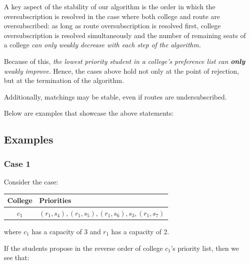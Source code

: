 \documentclass{article}
\begin{document}
A key aspect of the stability of our algorithm is the order in which the oversubscription is resolved in the case where both college and route are oversubscribed: as long as route oversubscription is resolved first, college oversubscription is resolved simultaneously and the number of remaining seats of a college \textit{can only weakly decrease with each step of the algorithm.}

Because of this, \textit{the lowest priority student in a college's preference list can \textbf{only} weakly improve.} Hence, the cases above hold not only at the point of rejection, but at the termination of the algorithm.

Additionally, matchings may be stable, even if routes are undersubscribed.

Below are examples that showcase the above statements:

\subsection{Examples}
\subsubsection{Case 1}
Consider the case:

\begin{center}
    \begin{tabular}{ c|l }
        College&Priorities \\
        \hline
        $c_1$&$(r_1,s_4),(r_1,s_5),(r_1,s_6),s_3,(r_1,s_7)$ \\
    \end{tabular}
\end{center}

where $c_1$ has a capacity of 3 and $r_1$ has a capacity of 2.

If the students propose in the reverse order of college $c_1$'s priority list, then we see that:
\end{document}
